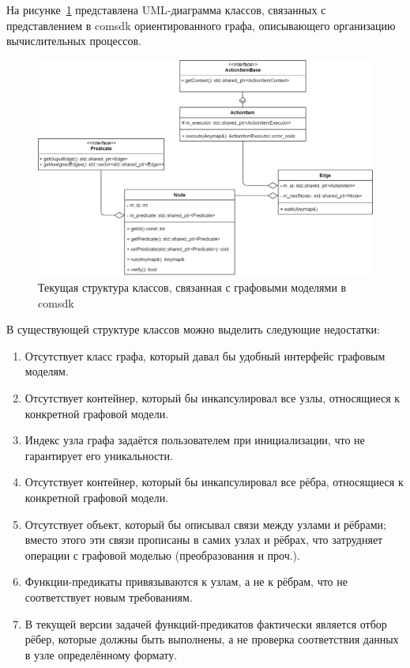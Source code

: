 \def\notedate{2022.03.09}
\def\currentauthor{Тришин И.В. (РК6)}

На рисунке~\ref{fig:oldGraphStructure} представлена UML-диаграмма классов, связанных с представлением в comsdk ориентированного графа, описывающего организацию вычислительных процессов.

\begin{figure}[H]
    \includegraphics[width=\textwidth]{ResearchNotes/rndhpc_not_blo_2022_03_09/structure.png}
    \caption{Текущая структура классов, связанная с графовыми моделями в comsdk}\label{fig:oldGraphStructure}
\end{figure}

В существующей структуре классов можно выделить следующие недостатки:
\begin{enumerate}
    \item Отсутствует класс графа, который давал бы удобный интерфейс графовым моделям.
    \item Отсутствует контейнер, который бы инкапсулировал все узлы, относящиеся к конкретной графовой модели.
    \item Индекс узла графа задаётся пользователем при инициализации, что не гарантирует его уникальности.
    \item Отсутствует контейнер, который бы инкапсулировал все рёбра, относящиеся к конкретной графовой модели.
    \item Отсутствует объект, который бы описывал связи между узлами и рёбрами; вместо этого эти связи прописаны в самих узлах и рёбрах, что затрудняет операции с графовой моделью (преобразования и проч.).
    \item Функции-предикаты привязываются к узлам, а не к рёбрам, что не соответствует новым требованиям.
    \item В текущей версии задачей функций-предикатов фактически является отбор рёбер, которые должны быть выполнены, а не проверка соответствия данных в узле определённому формату.
\end{enumerate}